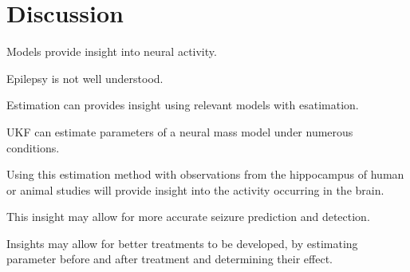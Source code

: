 \section{Discussion}

Models provide insight into neural activity.

Epilepsy is not well understood.

Estimation can provides insight using relevant models with esatimation.

UKF can estimate parameters of a neural mass model under numerous conditions.

Using this estimation method with observations from the hippocampus of human or animal studies will provide insight into the activity occurring in the brain.

This insight may allow for more accurate seizure prediction and detection. 

Insights may allow for better treatments to be developed, by estimating parameter before and after treatment and determining their effect.


